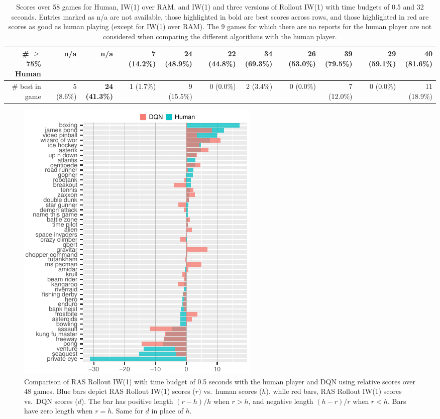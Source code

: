 \documentclass[letterpaper]{article}
\begin{document}
\begin{table}[p]
{\begin{tabular}{@{}rrrrr@{}rr@{}r@{}rr@{}r@{}rr@{}r@{}rr@{}}
        \# $\geq$ 75\% Human &&        n/a &         n/a &&     7 (14.2\%) &    24 (48.9\%) &&    22 (44.8\%) &     34 (69.3\%) &&    26 (53.0\%) &     39 (79.5\%) &&    29 (59.1\%) &\bf  40 (81.6\%) \\
\midrule
             \# best in game &&  5 (8.6\%) &\bf  24 (41.3\%) &&  1 (1.7\%) &     9 (15.5\%) &&      0 (0.0\%) &       2 (3.4\%) &&      0 (0.0\%) &      7 (12.0\%) &&      0 (0.0\%) &     11 (18.9\%) \\
\bottomrule
\end{tabular}
  }
  \caption{
    Scores over 58 games for Human, IW(1) over RAM, and IW(1) and three versions of Rollout IW(1) with time budgets
    of 0.5 and 32 seconds. Entries marked as n/a are not available, those highlighted in bold are best scores across
    rows, and those highlighted in red are scores as good as human playing (except for IW(1) over RAM).
    The 9 games for which there are no reports for the human player are not considered when comparing the
    different algorithms with the human player.
  }
  \label{table:big2}
\end{table}


\begin{figure}[t]
  \centering
  \includegraphics[width=\columnwidth]{110-15-halfsec-bars}
  \caption{Comparison of RAS Rollout IW(1) with time budget of 0.5 seconds with
    the human player and DQN using relative scores over 48 games.
    Blue bars depict RAS Rollout IW(1) scores ($r)$ vs.\ human scores ($h$), while
    red bars, RAS Rollout IW(1) scores vs.\ DQN scores ($d$). The bar has positive length $(r-h)/h$
    when $r>h$, and negative length $(h-r)/r$ when $r<h$. Bars have zero length when $r=h$.
    Same for $d$ in place of $h$.
  }
  \label{fig:110:bars:half}
\end{figure}
\end{document}
